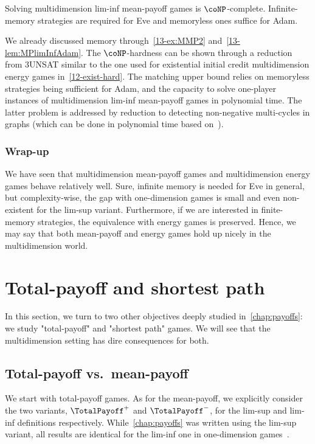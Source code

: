 \begin{theorem}
Solving multidimension lim-inf mean-payoff games is $\coNP$-com\-plete. Infinite-memory strategies are required for Eve and memoryless ones suffice for Adam.
\end{theorem}

We already discussed memory through~\cref{13-ex:MMP2} and~\cref{13-lem:MPlimInfAdam}. The $\coNP$-hardness can be shown through a reduction from \textsf{3UNSAT} similar to the one used for existential initial credit multidimension energy games in~\cref{12-exist-hard}. The matching upper bound relies on memoryless strategies being sufficient for Adam, and the capacity to solve one-player instances of multidimension lim-inf mean-payoff games in polynomial time. The latter problem is addressed by reduction to detecting non-negative multi-cycles in graphs (which can be done in polynomial time based on~\cite{Kosaraju&Sullivan:1988}).

\subsubsection*{Wrap-up} 
We have seen that multidimension mean-payoff games and multidimension energy games behave relatively well. Sure, infinite memory is needed for Eve in general, but complexity-wise, the gap with one-dimension games is small and even non-existent for the lim-sup variant. Furthermore, if we are interested in finite-memory strategies, the equivalence with energy games is preserved. Hence, we may say that both mean-payoff and energy games hold up nicely in the multidimension world.

\section{Total-payoff and shortest path}
\label{13-sec:TPSP}

In this section, we turn to two other objectives deeply studied in~\cref{chap:payoffs}: we study "total-payoff" and "shortest path" games. We will see that the multidimension setting has dire consequences for both.

\subsection{Total-payoff vs.~mean-payoff}

We start with total-payoff games. As for the mean-payoff, we explicitly consider the two variants, $\TotalPayoff^+$ and $\TotalPayoff^-$, for the lim-sup and lim-inf definitions respectively. While~\cref{chap:payoffs} was written using the lim-sup variant, all results are identical for the lim-inf one in one-dimension games~\cite{Gawlitza&Seidl:2009}.

